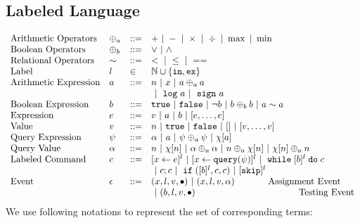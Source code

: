 %
%
\subsection{Labeled Language}
\[
\begin{array}{llll}
\mbox{Arithmetic Operators} 
& \oplus_a & ::= & + ~|~ - ~|~ \times 
%
~|~ \div ~|~ \max ~|~ \min\\  
\mbox{Boolean Operators} 
& \oplus_b & ::= & \lor ~|~ \land
\\
%
\mbox{Relational Operators} 
& \sim & ::= & < ~|~ \leq ~|~ == 
\\  
%
\mbox{Label} 
& l & \in & \mathbb{N} \cup \{\lin, \lex\} 
\\ 
%
\mbox{Arithmetic Expression} 
& \aexpr & ::= & 
n ~|~ {x} ~|~ \aexpr \oplus_a \aexpr  
\\
&  &  & 
 ~|~ \elog \aexpr  ~|~ \esign \aexpr
\\
%
\mbox{Boolean Expression} & \bexpr & ::= & 
%
\etrue ~|~ \efalse  ~|~ \neg \bexpr
 ~|~ \bexpr \oplus_b \bexpr
%
~|~ \aexpr \sim \aexpr 
\\
%
\mbox{Expression} & \expr & ::= & v ~|~ \aexpr ~|~ \bexpr ~|~ [\expr, \dots, \expr]
\\  
%
\mbox{Value} 
& v & ::= & { n ~|~ \etrue ~|~ \efalse ~|~ [] ~|~ [v, \dots, v]}  
\\
%
\mbox{Query Expression} 
& {\qexpr} & ::= 
& { \qval ~|~ \aexpr ~|~ \qexpr \oplus_a \qexpr ~|~ \chi[\aexpr]} 
\\
%
\mbox{Query Value} & \qval & ::= 
& {n ~|~ \chi[n] ~|~ \qval \oplus_a  \qval ~|~ n \oplus_a  \chi[n]
    ~|~ \chi[n] \oplus_a  n}
    \\
\mbox{Labeled Command} 
& {c} & ::= &   [\assign {{x}}{ {\expr}}]^{l} ~|~  [\assign {{x} } {{\query(\qexpr)}}]^{l}
~|~ {\ewhile [ \bexpr ]^{l} \edo {c} }
\\
&&&
~|~ {c};{c}  
~|~ \eif([\bexpr]{}^l , {c}, {c}) 
~|~ [\eskip]^l\\ 
\mbox{Event} 
& \event & ::= & 
    ({x}, l, v, \bullet) ~|~ ({x}, l, v, \qval)  ~~~~~~~~~~~ \mbox{Assignment Event} \\
&&& ~|~(\bexpr, l, v, \bullet)   ~~~~~~~~~~~~~~~~~~~~~~~~~~~~~~~~~~ \mbox{Testing Event}
\\
\end{array}
\]
We use following notations to represent the set of corresponding terms:

